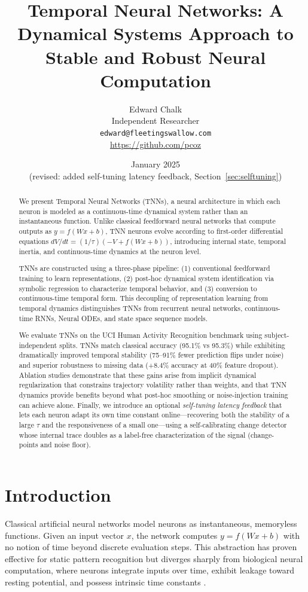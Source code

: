\documentclass[11pt]{article}
\title{Temporal Neural Networks: A Dynamical Systems Approach to Stable and Robust Neural Computation}
\author{
    Edward Chalk\\
    Independent Researcher\\
    \texttt{edward@fleetingswallow.com}\\
    \url{https://github.com/pcoz}
}
\date{January 2025 \\ \small(revised: added self-tuning latency feedback, Section~\ref{sec:selftuning})}
\begin{document}
\maketitle

\begin{abstract}
We present Temporal Neural Networks (TNNs), a neural architecture in which each neuron is modeled as a continuous-time dynamical system rather than an instantaneous function. Unlike classical feedforward neural networks that compute outputs as $y = f(Wx + b)$, TNN neurons evolve according to first-order differential equations $dV/dt = (1/\tau)(-V + f(Wx + b))$, introducing internal state, temporal inertia, and continuous-time dynamics at the neuron level.

TNNs are constructed using a three-phase pipeline: (1) conventional feedforward training to learn representations, (2) post-hoc dynamical system identification via symbolic regression to characterize temporal behavior, and (3) conversion to continuous-time temporal form. This decoupling of representation learning from temporal dynamics distinguishes TNNs from recurrent neural networks, continuous-time RNNs, Neural ODEs, and state space sequence models.

We evaluate TNNs on the UCI Human Activity Recognition benchmark using subject-independent splits. TNNs match classical accuracy (95.1\% vs 95.3\%) while exhibiting dramatically improved temporal stability (75--91\% fewer prediction flips under noise) and superior robustness to missing data (+8.4\% accuracy at 40\% feature dropout). Ablation studies demonstrate that these gains arise from implicit dynamical regularization that constrains trajectory volatility rather than weights, and that TNN dynamics provide benefits beyond what post-hoc smoothing or noise-injection training can achieve alone. Finally, we introduce an optional \emph{self-tuning latency feedback} that lets each neuron adapt its own time constant online---recovering both the stability of a large $\tau$ and the responsiveness of a small one---using a self-calibrating change detector whose internal trace doubles as a label-free characterization of the signal (change-points and noise floor).
\end{abstract}

\section{Introduction}

Classical artificial neural networks model neurons as instantaneous, memoryless functions. Given an input vector $x$, the network computes $y = f(Wx + b)$ with no notion of time beyond discrete evaluation steps. This abstraction has proven effective for static pattern recognition but diverges sharply from biological neural computation, where neurons integrate inputs over time, exhibit leakage toward resting potential, and possess intrinsic time constants \citep{gerstner2002spiking}.
\end{document}
